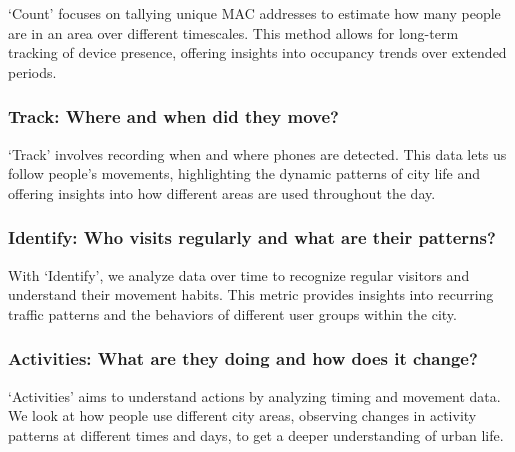 \documentclass[
  letterpaper,
]{scrbook}
\begin{document}
`Count' focuses on tallying unique MAC addresses to estimate how many
people are in an area over different timescales. This method allows for
long-term tracking of device presence, offering insights into occupancy
trends over extended periods.

\subsubsection*{\texorpdfstring{\textbf{Track: Where and when did they
move?}}{Track: Where and when did they move?}}\label{track-where-and-when-did-they-move}

`Track' involves recording when and where phones are detected. This data
lets us follow people's movements, highlighting the dynamic patterns of
city life and offering insights into how different areas are used
throughout the day.

\subsubsection*{\texorpdfstring{\textbf{Identify: Who visits regularly
and what are their
patterns?}}{Identify: Who visits regularly and what are their patterns?}}\label{identify-who-visits-regularly-and-what-are-their-patterns}

With `Identify', we analyze data over time to recognize regular visitors
and understand their movement habits. This metric provides insights into
recurring traffic patterns and the behaviors of different user groups
within the city.

\subsubsection*{\texorpdfstring{\textbf{Activities: What are they doing
and how does it
change?}}{Activities: What are they doing and how does it change?}}\label{activities-what-are-they-doing-and-how-does-it-change}

`Activities' aims to understand actions by analyzing timing and movement
data. We look at how people use different city areas, observing changes
in activity patterns at different times and days, to get a deeper
understanding of urban life.
\end{document}
